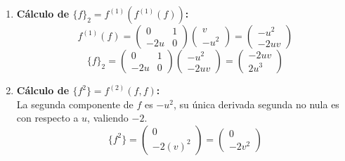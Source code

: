\begin{enumerate}[a)]
\begin{sol}
\begin{enumerate}
    \item \textbf{Cálculo de $\{f\}_2 = f^{(1)}(f^{(1)}(f))$:}
    \[
    f^{(1)}(f) = \begin{pmatrix} 0 & 1 \\ -2u & 0 \end{pmatrix} \begin{pmatrix} v \\ -u^2 \end{pmatrix} = \begin{pmatrix} -u^2 \\ -2uv \end{pmatrix}
    \]
    \[
    \{f\}_2 = \begin{pmatrix} 0 & 1 \\ -2u & 0 \end{pmatrix} \begin{pmatrix} -u^2 \\ -2uv \end{pmatrix} = \begin{pmatrix} -2uv \\ 2u^3 \end{pmatrix}
    \]
    
    \item \textbf{Cálculo de $\{f^2\} = f^{(2)}(f, f)$:} \\
    La segunda componente de $f$ es $-u^2$, su única derivada segunda no nula es con respecto a $u$, valiendo $-2$.
    \[
    \{f^2\} = \begin{pmatrix} 0 \\ -2(v)^2 \end{pmatrix} = \begin{pmatrix} 0 \\ -2v^2 \end{pmatrix}
    \]
\end{enumerate}


\end{sol}
\end{enumerate}
